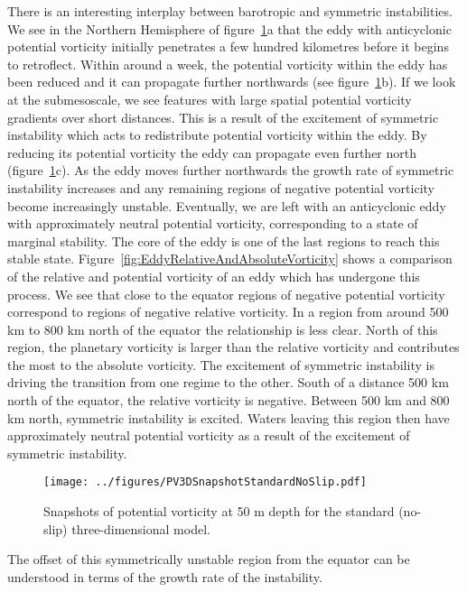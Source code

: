 There is an interesting interplay between barotropic and symmetric instabilities. We see in the Northern Hemisphere of figure~\ref{fig:PVStandardNoSlip3D}a that the eddy with anticyclonic potential vorticity initially penetrates a few hundred kilometres before it begins to retroflect. Within around a week, the potential vorticity within the eddy has been reduced and it can propagate further northwards (see figure~\ref{fig:PVStandardNoSlip3D}b). If we look at the submesoscale, we see features with large spatial potential vorticity gradients over short distances. This is a result of the excitement of symmetric instability which acts to redistribute potential vorticity within the eddy. By reducing its potential vorticity the eddy can propagate even further north (figure~\ref{fig:PVStandardNoSlip3D}c). As the eddy moves further northwards the growth rate of symmetric instability increases and any remaining regions of negative potential vorticity become increasingly unstable. Eventually, we are left with an anticyclonic eddy with approximately neutral potential vorticity, corresponding to a state of marginal stability. The core of the eddy is one of the last regions to reach this stable state. Figure~\ref{fig:EddyRelativeAndAbsoluteVorticity} shows a comparison of the relative and potential vorticity of an eddy which has undergone this process. We see that close to the equator regions of negative potential vorticity correspond to regions of negative relative vorticity. In a region from around 500 km to 800 km north of the equator the relationship is less clear. North of this region, the planetary vorticity is larger than the relative vorticity and contributes the most to the absolute vorticity. The excitement of symmetric instability is driving the transition from one regime to the other. South of a distance 500 km north of the equator, the relative vorticity is negative. Between 500 km and 800 km north, symmetric instability is excited. Waters leaving this region then have approximately neutral potential vorticity as a result of the excitement of symmetric instability.

\begin{figure}
    \centering
    \texttt{[image: ../figures/PV3DSnapshotStandardNoSlip.pdf]}
    \caption{Snapshots of potential vorticity at 50 m depth for the standard (no-slip) three-dimensional model.}
    \label{fig:PVStandardNoSlip3D}
\end{figure}

The offset of this symmetrically unstable region from the equator can be understood in terms of the growth rate of the instability.

